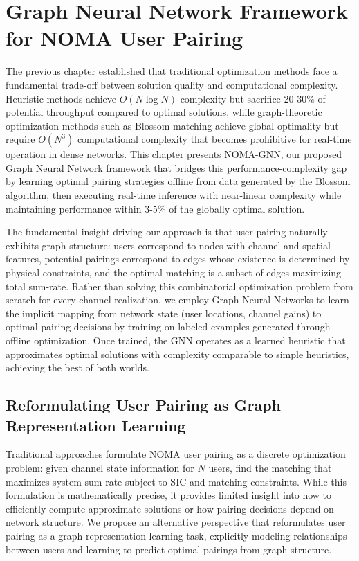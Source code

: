 \chapter{Graph Neural Network Framework for NOMA User Pairing}
\label{chap:gnn}

The previous chapter established that traditional optimization methods face a fundamental trade-off between solution quality and computational complexity. Heuristic methods achieve $O(N \log N)$ complexity but sacrifice 20-30\% of potential throughput compared to optimal solutions, while graph-theoretic optimization methods such as Blossom matching achieve global optimality but require $O(N^3)$ computational complexity that becomes prohibitive for real-time operation in dense networks. This chapter presents NOMA-GNN, our proposed Graph Neural Network framework that bridges this performance-complexity gap by learning optimal pairing strategies offline from data generated by the Blossom algorithm, then executing real-time inference with near-linear complexity while maintaining performance within 3-5\% of the globally optimal solution.

The fundamental insight driving our approach is that user pairing naturally exhibits graph structure: users correspond to nodes with channel and spatial features, potential pairings correspond to edges whose existence is determined by physical constraints, and the optimal matching is a subset of edges maximizing total sum-rate. Rather than solving this combinatorial optimization problem from scratch for every channel realization, we employ Graph Neural Networks to learn the implicit mapping from network state (user locations, channel gains) to optimal pairing decisions by training on labeled examples generated through offline optimization. Once trained, the GNN operates as a learned heuristic that approximates optimal solutions with complexity comparable to simple heuristics, achieving the best of both worlds.

\section{Reformulating User Pairing as Graph Representation Learning}

Traditional approaches formulate NOMA user pairing as a discrete optimization problem: given channel state information for $N$ users, find the matching that maximizes system sum-rate subject to SIC and matching constraints. While this formulation is mathematically precise, it provides limited insight into how to efficiently compute approximate solutions or how pairing decisions depend on network structure. We propose an alternative perspective that reformulates user pairing as a graph representation learning task, explicitly modeling relationships between users and learning to predict optimal pairings from graph structure.

